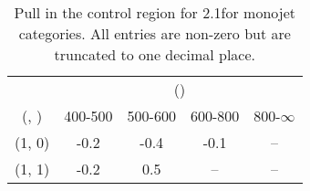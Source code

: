 \begin{table}[h!]
\tiny
\centering
\caption{Pull in the \gj control region for 2.1\ifb for monojet categories. All entries are non-zero but are truncated to one decimal place.\label{tab:pullsepnaive_gj_ewk_mono}}
\begin{tabular}
{ccccc}
	\hline\hline
	& \multicolumn{4}{c}{\scalht (\gev)} \\ 
	 (\njet,  \nb) & 400-500 & 500-600 & 600-800 & 800-$\infty$ \\ [0.8ex] 
\hline
	(1, 0) & -0.2 & -0.4 & -0.1 & -- \\[0.5ex] 
	(1, 1) & -0.2 & 0.5 & -- & -- \\[0.5ex] 
	\hline
	\hline
\end{tabular}
\end{table}
